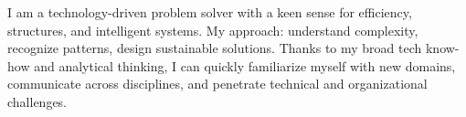

\begin{cvparagraph}
I am a technology-driven problem solver with a keen sense for efficiency, structures, and intelligent systems. My approach: understand complexity, recognize patterns, design sustainable solutions. Thanks to my broad tech know-how and analytical thinking, I can quickly familiarize myself with new domains, communicate across disciplines, and penetrate technical and organizational challenges.
\end{cvparagraph}